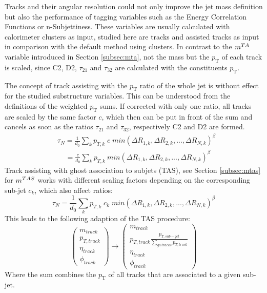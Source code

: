 Tracks and their angular resolution could not only improve the jet mass definition but also the performance of tagging variables such as the Energy Correlation Functions or n-Subjettiness. These variables are usually calculated with calorimeter clusters as input, studied here are tracks and assisted tracks as input in comparison with the default method using clusters. 
In contrast to the $m^{TA}$ variable introduced in Section \ref{subsec:mta}, not the mass but the $p_{\mathrm{T}}$ of each track is scaled, since C2, D2, $\tau_{21}$ and $\tau_{32}$ are calculated with the constituents $p_{\mathrm{T}}$.

The concept of track assisting with the $p_{\mathrm{T}}$ ratio of the whole jet is without effect for the studied substructure variables. This can be understood from the definitions of the weighted $p_{\mathrm{T}}$ sums. If corrected with only one ratio, all tracks are scaled by the same factor $c$, which then can be put in front of the sum and cancels as soon as the ratios $\tau_{21}$ and $\tau_{32}$, respectively C2 and D2 are formed.
\begin{equation}
\begin{aligned}
 & \tau_N ={} \frac{1}{d_0}\sum_k p_{T,k} \; c \; min(\Delta R_{1,k},\Delta R_{2,k},...,\Delta R_{N,k})^{\beta} \\
 & \; \; \; \;  ={} \frac{c}{d_0}\sum_k p_{T,k}\:min(\Delta R_{1,k},\Delta R_{2,k},...,\Delta R_{N,k})^{\beta}
\end{aligned}
\end{equation}
Track assisting with ghost association to subjets (TAS), see Section \ref{subsec:mtas} for $m^{TAS}$ works with different scaling factors depending on the corresponding sub-jet $c_k$, which also affect ratios:
\begin{equation}
\tau_N = \frac{1}{d_0}\sum_k p_{T,k} \; c_k \; min(\Delta R_{1,k},\Delta R_{2,k},...,\Delta R_{N,k})^{\beta} 
\end{equation}\label{eq:tas_ta}
This leads to the following adaption of the TAS procedure:
\begin{equation}
\begin{pmatrix}
                    m_{track} \\ p_{T,track} \\ \eta_{track} \\  \phi_{track}
                    \end{pmatrix}       \rightarrow \begin{pmatrix}
                    m_{track}  \\ p_{T,track}  \frac{p_{T,sub-jet}}{\sum\limits_{ga\:tracks}p_{T,track}} \\ \eta_{track} \\ \phi_{track}
            
            \end{pmatrix}  
\end{equation}\label{eq:track_tas}
Where the sum combines the $p_{\mathrm{T}}$ of all tracks that are associated to a given sub-jet. 



